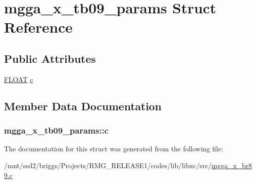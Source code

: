 \hypertarget{structmgga__x__tb09__params}{\section{mgga\-\_\-x\-\_\-tb09\-\_\-params Struct Reference}
\label{structmgga__x__tb09__params}
}
\subsection*{Public Attributes}
\begin{DoxyCompactItemize}
\item 
\hyperlink{src_2xc__config_8h_ae8690abbffa85934d64d545920e2b108}{F\-L\-O\-A\-T} \hyperlink{structmgga__x__tb09__params_a43a3cec8c68137b22a9e8cd14da770c5}{c}
\end{DoxyCompactItemize}


\subsection{Member Data Documentation}
\hypertarget{structmgga__x__tb09__params_a43a3cec8c68137b22a9e8cd14da770c5}{
\subsubsection[{c}]{ mgga\-\_\-x\-\_\-tb09\-\_\-params\-::c}}\label{structmgga__x__tb09__params_a43a3cec8c68137b22a9e8cd14da770c5}


The documentation for this struct was generated from the following file\-:\begin{DoxyCompactItemize}
\item 
/mnt/ssd2/briggs/\-Projects/\-R\-M\-G\-\_\-\-R\-E\-L\-E\-A\-S\-E1/codes/lib/libxc/src/\hyperlink{mgga__x__br89_8c}{mgga\-\_\-x\-\_\-br89.\-c}\end{DoxyCompactItemize}
